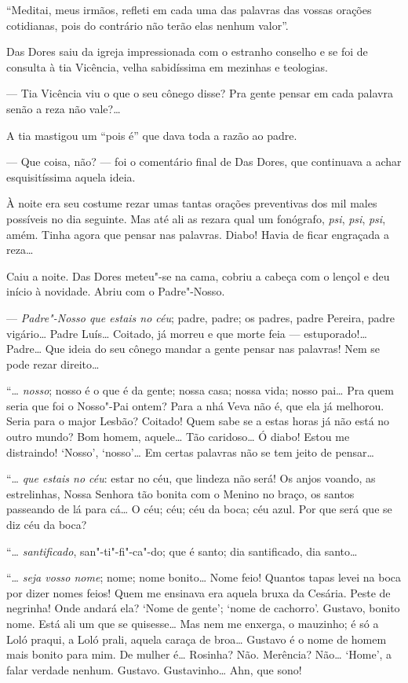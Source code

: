 ``Meditai, meus irmãos, refleti em cada uma das palavras das vossas
orações cotidianas, pois do contrário não terão elas nenhum valor''.

Das Dores saiu da igreja impressionada com o estranho conselho e se foi
de consulta à tia Vicência, velha sabidíssima em mezinhas e teologias.

--- Tia Vicência viu o que o seu cônego disse? Pra gente pensar em cada
palavra senão a reza não vale?\ldots{}

A tia mastigou um ``pois é'' que dava toda a razão ao padre.

--- Que coisa, não? --- foi o comentário final de Das Dores, que
continuava a achar esquisitíssima aquela ideia.

À noite era seu costume rezar umas tantas orações preventivas dos mil
males possíveis no dia seguinte. Mas até ali as rezara qual um
fonógrafo, \emph{psi}, \emph{psi}, \emph{psi}, amém. Tinha agora que
pensar nas palavras. Diabo! Havia de ficar engraçada a reza\ldots{}

Caiu a noite. Das Dores meteu"-se na cama, cobriu a cabeça com o lençol e
deu início à novidade. Abriu com o Padre"-Nosso.

--- \emph{Padre"-Nosso que estais no céu}; padre, padre; os padres, padre
Pereira, padre vigário\ldots{} Padre Luís\ldots{} Coitado, já morreu e que morte
feia --- estuporado!\ldots{} Padre\ldots{} Que ideia do seu cônego mandar a gente
pensar nas palavras! Nem se pode rezar direito\ldots{}

``\ldots{} \emph{nosso}; nosso é o que é da gente; nossa casa; nossa vida;
nosso pai\ldots{} Pra quem seria que foi o Nosso"-Pai ontem? Para a nhá Veva
não é, que ela já melhorou. Seria para o major Lesbão? Coitado! Quem
sabe se a estas horas já não está no outro mundo? Bom homem, aquele\ldots{}
Tão caridoso\ldots{} Ó diabo! Estou me distraindo! `Nosso', `nosso'\ldots{} Em
certas palavras não se tem jeito de pensar\ldots{}

``\ldots{} \emph{que estais no céu}: estar no céu, que lindeza não será! Os
anjos voando, as estrelinhas, Nossa Senhora tão bonita com o Menino no
braço, os santos passeando de lá para cá\ldots{} O céu; céu; céu da boca; céu
azul. Por que será que se diz céu da boca?

``\ldots{} \emph{santificado}, san"-ti"-fi"-ca"-do; que é santo; dia santificado,
dia santo\ldots{}

``\ldots{} \emph{seja vosso nome}; nome; nome bonito\ldots{} Nome feio! Quantos
tapas levei na boca por dizer nomes feios! Quem me ensinava era aquela
bruxa da Cesária. Peste de negrinha! Onde andará ela? `Nome de gente';
`nome de cachorro'. Gustavo, bonito nome. Está ali um que se quisesse\ldots{}
Mas nem me enxerga, o mauzinho; é só a Loló praqui, a Loló prali, aquela
caraça de broa\ldots{} Gustavo é o nome de homem mais bonito para mim. De
mulher é\ldots{} Rosinha? Não. Merência? Não\ldots{} `Home', a falar verdade
nenhum. Gustavo. Gustavinho\ldots{} Ahn, que sono!

